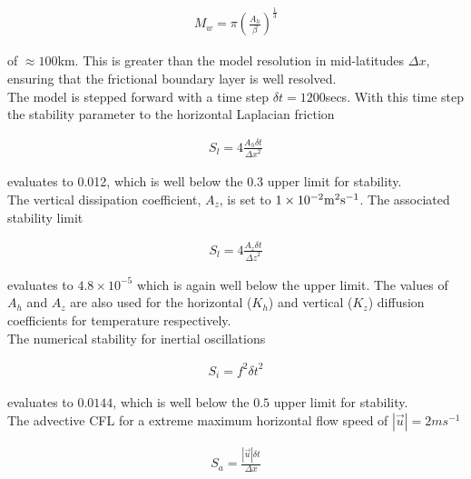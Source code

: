 \begin{eqnarray}
\label{EQ:munk_layer}
M_{w} = \pi ( \frac { A_{h} }{ \beta } )^{\frac{1}{3}}
\end{eqnarray}

\noindent  of $\approx 100$km. This is greater than the model
resolution in mid-latitudes $\Delta x$, ensuring that the frictional 
boundary layer is well resolved.
\\

\noindent The model is stepped forward with a 
time step $\delta t=1200$secs. With this time step the stability 
parameter to the horizontal Laplacian friction \cite{adcroft:95}

\begin{eqnarray}
\label{EQ:laplacian_stability}
S_{l} = 4 \frac{A_{h} \delta t}{{\Delta x}^2}
\end{eqnarray}

\noindent evaluates to 0.012, which is well below the 0.3 upper limit
for stability. 
\\

\noindent The vertical dissipation coefficient, $A_{z}$, is set to 
$1\times10^{-2} {\rm m}^2{\rm s}^{-1}$. The associated stability limit

\begin{eqnarray}
\label{EQ:laplacian_stability_z}
S_{l} = 4 \frac{A_{z} \delta t}{{\Delta z}^2}
\end{eqnarray}

\noindent evaluates to $4.8 \times 10^{-5}$ which is again well below
the upper limit.
The values of $A_{h}$ and $A_{z}$ are also used for the horizontal ($K_{h}$) 
and vertical ($K_{z}$) diffusion coefficients for temperature respectively.
\\

\noindent The numerical stability for inertial oscillations
\cite{adcroft:95} 

\begin{eqnarray}
\label{EQ:inertial_stability}
S_{i} = f^{2} {\delta t}^2
\end{eqnarray}

\noindent evaluates to $0.0144$, which is well below the $0.5$ upper 
limit for stability.
\\

\noindent The advective CFL \cite{adcroft:95} for a extreme maximum 
horizontal flow
speed of $ | \vec{u} | = 2 ms^{-1}$

\begin{eqnarray}
\label{EQ:cfl_stability}
S_{a} = \frac{| \vec{u} | \delta t}{ \Delta x}
\end{eqnarray}

